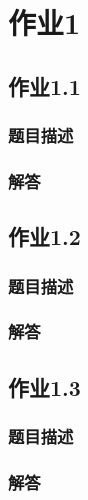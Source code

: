 
\section{作业1}
\subsection{作业1.1}
\subsubsection{题目描述}
\subsubsection{解答}

\subsection{作业1.2}
\subsubsection{题目描述}
\subsubsection{解答}

\subsection{作业1.3}
\subsubsection{题目描述}
\subsubsection{解答}